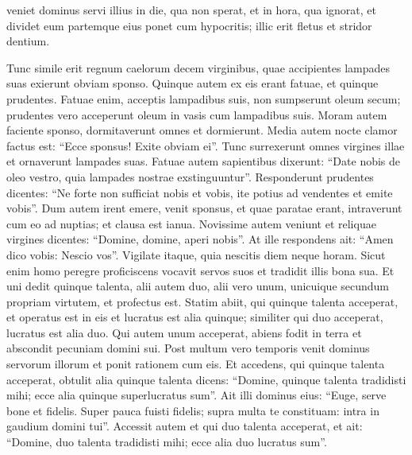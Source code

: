 \begin{biblechapter}
\begin{biblechapter}
\begin{biblechapter}
\begin{biblechapter}
\begin{biblechapter}
\begin{biblechapter}
\begin{biblechapter}
\begin{biblechapter}
\begin{biblechapter}
\begin{biblechapter}
\begin{biblechapter}
\begin{biblechapter}
\begin{biblechapter}
\begin{biblechapter}
\begin{biblechapter}
\begin{biblechapter}
\begin{biblechapter}
\begin{biblechapter}
\begin{biblechapter}
\begin{biblechapter}
\begin{biblechapter}
\begin{biblechapter}
\begin{biblechapter}
\begin{biblechapter}
\verse veniet dominus servi illius in die, qua non sperat, et in hora, qua ignorat, 
\verse et dividet eum partemque eius ponet cum hypocritis; illic erit fletus et stridor dentium.
 
\begin{biblechapter}
\verse Tunc simile erit regnum caelorum decem virginibus, quae accipientes lampades suas exierunt obviam sponso. 
\verse Quinque autem ex eis erant fatuae, et quinque prudentes. 
\verse Fatuae enim, acceptis lampadibus suis, non sumpserunt oleum secum; 
\verse prudentes vero acceperunt oleum in vasis cum lampadibus suis. 
\verse Moram autem faciente sponso, dormitaverunt omnes et dormierunt. 
\verse Media autem nocte clamor factus est: “Ecce sponsus! Exite obviam ei”. 
\verse Tunc surrexerunt omnes virgines illae et ornaverunt lampades suas. 
\verse Fatuae autem sapientibus dixerunt: “Date nobis de oleo vestro, quia lampades nostrae exstinguuntur”. 
\verse Responderunt prudentes dicentes: “Ne forte non sufficiat nobis et vobis, ite potius ad vendentes et emite vobis”. 
 \verse Dum autem irent emere, venit sponsus, et quae paratae erant, intraverunt cum eo ad nuptias; et clausa est ianua. 
\verse Novissime autem veniunt et reliquae virgines dicentes: “Domine, domine, aperi nobis”. 
\verse At ille respondens ait: “Amen dico vobis: Nescio vos”. 
\verse Vigilate itaque, quia nescitis diem neque horam.
 \verse Sicut enim homo peregre proficiscens vocavit servos suos et tradidit illis bona sua. 
\verse Et uni dedit quinque talenta, alii autem duo, alii vero unum, unicuique secundum propriam virtutem, et profectus est. Statim 
\verse abiit, qui quinque talenta acceperat, et operatus est in eis et lucratus est alia quinque; 
\verse similiter qui duo acceperat, lucratus est alia duo. 
\verse Qui autem unum acceperat, abiens fodit in terra et abscondit pecuniam domini sui. 
\verse Post multum vero temporis venit dominus servorum illorum et ponit rationem cum eis. 
\verse Et accedens, qui quinque talenta acceperat, obtulit alia quinque talenta dicens: “Domine, quinque talenta tradidisti mihi; ecce alia quinque superlucratus sum”. 
\verse Ait illi dominus eius: “Euge, serve bone et fidelis. Super pauca fuisti fidelis; supra multa te constituam: intra in gaudium domini tui”. 
\verse Accessit autem et qui duo talenta acceperat, et ait: “Domine, duo talenta tradidisti mihi; ecce alia duo lucratus sum”. 

\end{biblechapter}
\end{biblechapter}
\end{biblechapter}
\end{biblechapter}
\end{biblechapter}
\end{biblechapter}
\end{biblechapter}
\end{biblechapter}
\end{biblechapter}
\end{biblechapter}
\end{biblechapter}
\end{biblechapter}
\end{biblechapter}
\end{biblechapter}
\end{biblechapter}
\end{biblechapter}
\end{biblechapter}
\end{biblechapter}
\end{biblechapter}
\end{biblechapter}
\end{biblechapter}
\end{biblechapter}
\end{biblechapter}
\end{biblechapter}
\end{biblechapter}
